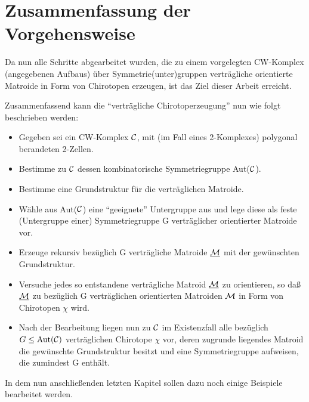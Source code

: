 \clearpage
\section{Zusammenfassung der Vorgehensweise}

Da nun alle Schritte abgearbeitet wurden, die zu einem vorgelegten CW-Komplex
(angegebenen Aufbaus) über Symmetrie(unter)gruppen verträgliche orientierte
Matroide in Form von Chirotopen erzeugen, ist das Ziel dieser Arbeit erreicht.

Zusammenfassend kann die "`verträgliche Chirotoperzeugung"' nun wie folgt
beschrieben werden:

\begin{itemize}
\item Gegeben sei ein CW-Komplex ${\cal C}$, mit (im Fall eines 2-Komplexes)
      polygonal berandeten 2-Zellen.
\item Bestimme zu ${\cal C}$ dessen kombinatorische Symmetriegruppe Aut(${\cal C}$).
\item Bestimme eine Grundstruktur für die verträglichen Matroide.
\item Wähle aus Aut(${\cal C}$) eine "`geeignete"' Untergruppe aus und lege
      diese als feste (Untergruppe einer) Symmetriegruppe G verträglicher
      orientierter Matroide vor.
\item Erzeuge rekursiv bezüglich G verträgliche Matroide $\underline{\cal M}$
      mit der gewünschten Grundstruktur.
\item Versuche jedes so entstandene verträgliche Matroid $\underline{\cal M}$ zu
      orientieren, so daß $\underline{\cal M}$ zu bezüglich G verträglichen
      orientierten Matroiden $\cal M$ in Form von Chirotopen $\chi$ wird.
\item Nach der Bearbeitung liegen nun zu ${\cal C}$ im Existenzfall alle
      bezüglich $G\leq \mbox{Aut}({\cal C})$ verträglichen Chirotope $\chi$ vor,
      deren zugrunde liegendes Matroid die gewünschte Grundstruktur besitzt
      und eine Symmetriegruppe aufweisen, die zumindest G enthält.
\end{itemize}

In dem nun anschließenden letzten Kapitel sollen dazu noch einige Beispiele
bearbeitet werden.
